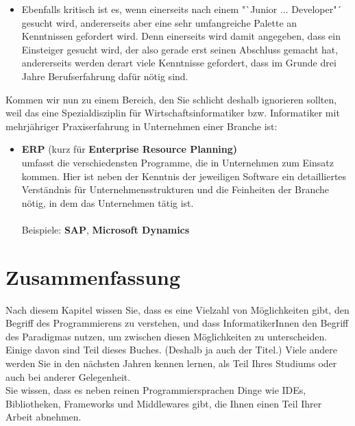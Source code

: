 \begin{itemize}
	\item Ebenfalls kritisch ist es, wenn einerseits nach einem "`Junior ... Developer"´ gesucht wird, andererseits aber eine sehr umfangreiche Palette an Kenntnissen gefordert wird. Denn einerseits wird damit angegeben, dass ein Einsteiger gesucht wird, der also gerade erst seinen Abschluss gemacht hat, andererseits werden derart viele Kenntnisse gefordert, dass im Grunde drei Jahre Berufserfahrung dafür nötig sind.

\end{itemize}

Kommen wir nun zu einem Bereich, den Sie schlicht deshalb ignorieren sollten, weil das eine Spezialdisziplin für Wirtschaftsinformatiker bzw. Informatiker mit mehrjähriger Praxiserfahrung in Unternehmen einer Branche ist:

\begin{itemize}
	\item \textbf{ERP} (kurz für \textbf{Enterprise Resource Planning)}\\
	umfasst die verschiedensten Programme, die in Unternehmen zum Einsatz kommen. Hier ist neben der Kenntnis der jeweiligen Software ein detailliertes Verständnis für Unternehmensstrukturen und die Feinheiten der Branche nötig, in dem das Unternehmen tätig ist.\\
	\\
	Beispiele: \textbf{SAP}, \textbf{Microsoft Dynamics}
	
\end{itemize}

\section{Zusammenfassung}

Nach diesem Kapitel wissen Sie, dass es eine Vielzahl von Möglichkeiten gibt, den Begriff des Programmierens zu verstehen, und dass InformatikerInnen den Begriff des Paradigmas nutzen, um zwischen diesen Möglich\-keiten zu unterscheiden. Einige davon sind Teil dieses Buches. (Deshalb ja auch der Titel.) Viele andere werden Sie in den nächsten Jahren kennen lernen, als Teil Ihres Studiums oder auch bei anderer Gelegenheit.\\

Sie wissen, dass es neben reinen Programmiersprachen Dinge wie IDEs, Bibliotheken, Frameworks und Middlewares gibt, die Ihnen einen Teil Ihrer Arbeit abnehmen.\\

